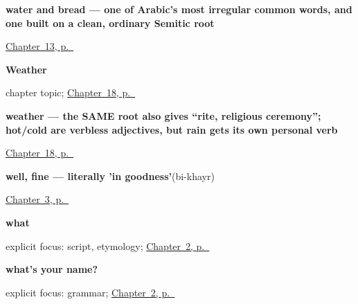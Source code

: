 \noindent\begin{minipage}[t]{\linewidth}
\raggedright
\textbf{water and bread — one of Arabic's most irregular common words, and one built on a clean, ordinary Semitic root}\enspace\emph{ }\par
\footnotesize \hyperref[ch:ar-water-and-bread]{Chapter~13, p.~\pageref*{ch:ar-water-and-bread}}
\end{minipage}\par\smallskip

\noindent\begin{minipage}[t]{\linewidth}
\raggedright
\textbf{Weather}\par
\footnotesize chapter topic; \hyperref[ch:ar-weather]{Chapter~18, p.~\pageref*{ch:ar-weather}}
\end{minipage}\par\smallskip

\noindent\begin{minipage}[t]{\linewidth}
\raggedright
\textbf{weather — the SAME root also gives \textquotedblleft{}rite, religious ceremony\textquotedblright{}; hot/cold are verbless adjectives, but rain gets its own personal verb}\enspace\emph{}\par
\footnotesize \hyperref[ch:ar-weather]{Chapter~18, p.~\pageref*{ch:ar-weather}}
\end{minipage}\par\smallskip

\noindent\begin{minipage}[t]{\linewidth}
\raggedright
\textbf{well, fine — literally 'in goodness'}\enspace\emph{}\enspace(bi-khayr)\par
\footnotesize \hyperref[ch:ar-how-are-you]{Chapter~3, p.~\pageref*{ch:ar-how-are-you}}
\end{minipage}\par\smallskip

\noindent\begin{minipage}[t]{\linewidth}
\raggedright
\textbf{what}\enspace\emph{}\par
\footnotesize explicit focus: script, etymology; \hyperref[ch:introductions]{Chapter~2, p.~\pageref*{ch:introductions}}
\end{minipage}\par\smallskip

\noindent\begin{minipage}[t]{\linewidth}
\raggedright
\textbf{what's your name?}\enspace\emph{ }\par
\footnotesize explicit focus: grammar; \hyperref[ch:introductions]{Chapter~2, p.~\pageref*{ch:introductions}}
\end{minipage}\par\smallskip

